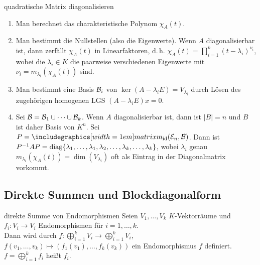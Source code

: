 \begin{Prozedur}{quadratische Matrix diagonalisieren}
    \begin{enumerate}
        \item Man berechnet das charakteristische Polynom $\chi_A(t)$.

        \item Man bestimmt die Nullstellen (also die Eigenwerte).
        Wenn $A$ diagonalisierbar ist, dann zerfällt $\chi_A(t)$ in
        Linearfaktoren, d.\,h.
        $\chi_A(t) = \prod_{i=1}^k (t - \lambda_i)^{\nu_i}$,
        wobei die $\lambda_i \in K$ die paarweise verschiedenen Eigenwerte
        mit $\nu_i = m_{\lambda_i}(\chi_A(t))$ sind.

        \item Man bestimmt eine Basis $\mathcal{B}_i$ von
        $\ker(A - \lambda_i E) = V_{\lambda_i}$ durch
        Lösen des zugehörigen homogenen LGS $(A - \lambda_i E)x = 0$.

        \item Sei $\mathcal{B} = \mathcal{B}_1 \cup \cdots \cup \mathcal{B}_k$.
        Wenn $A$ diagonalisierbar ist, dann ist $|B| = n$ und $B$ ist daher
        Basis von $K^n$.
        Sei $P = \hommatrix{\id}{\stdbasis{n}}{B}$.
        Dann ist $P^{-1}AP = \operatorname{diag}\{\lambda_1, \ldots, \lambda_1, \lambda_2,
        \ldots, \lambda_k, \ldots, \lambda_k\}$, wobei
        $\lambda_i$ genau $m_{\lambda_i}(\chi_A(t)) = \dim(V_{\lambda_i})$
        oft als Eintrag in der Diagonalmatrix vorkommt.
    \end{enumerate}
\end{Prozedur}

\subsection{%
    Direkte Summen und Blockdiagonalform%
}

\begin{Def}{direkte Summe von Endomorphismen}
    Seien $V_1, \ldots, V_k$ $K$-Vektorräume und $f_i: V_i \rightarrow V_i$
    Endomorphismen für $i = 1, \ldots, k$. \\
    Dann wird durch $f: \bigoplus_{i=1}^k V_i \rightarrow
    \bigoplus_{i=1}^k V_i$, $f(v_1, \ldots, v_k) \mapsto
    (f_1(v_1), \ldots, f_k(v_k))$ ein Endomorphismus $f$ definiert.
    $f = \bigoplus_{i=1}^k f_i$ heißt
     $f_i$.
\end{Def}

